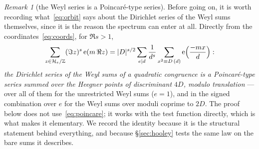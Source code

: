 \documentclass[11pt,a4paper]{article}
\theoremstyle{remark}\newtheorem{remark}[theorem]{Remark}
\newcommand{\Z}{\mathbb Z}\newcommand{\R}{\mathbb R}\newcommand{\Q}{\mathbb Q}\newcommand{\C}{\mathbb C}
\newcommand{\e}{\mathrm e}\newcommand{\Off}{\mathrm{Off}}\newcommand{\rep}[2]{\langle #1\rangle_{#2}}
\begin{document}
\begin{remark}[the Weyl series is a Poincar\'e-type series]\label{rem:poincare}
Before going on, it is worth recording what~\eqref{eq:orbit} says about the Dirichlet series of the Weyl sums
themselves, since it is the reason the spectrum can enter at all. Directly from the coordinates~\eqref{eq:coords},
for $\Re s>1$,
\begin{equation}\label{eq:poincare}
\sum_{z\in\mathcal H_e/\Z}(\Im z)^{s}\,\e(m\,\Re z)
=|D|^{s/2}\sum_{e\mid d}\frac1{d^{s}}\sum_{x^2\equiv D\,(d)}\e\Bigl(\frac{-mx}{d}\Bigr):
\end{equation}
\emph{the Dirichlet series of the Weyl sums of a quadratic congruence is a Poincar\'e-type series summed over the
Heegner points of discriminant $4D$, modulo translation} --- over all of them for the unrestricted Weyl sums
($e=1$), and in the signed combination over $e$ for the Weyl sums over moduli coprime to $2D$. The proof
below does not use~\eqref{eq:poincare}; it works with the test function directly, which is what makes it elementary.
We record the identity because it is the structural statement behind everything, and because \S\ref{sec:hooley}
tests the same law on the bare sums it describes.
\end{remark}
\end{document}
